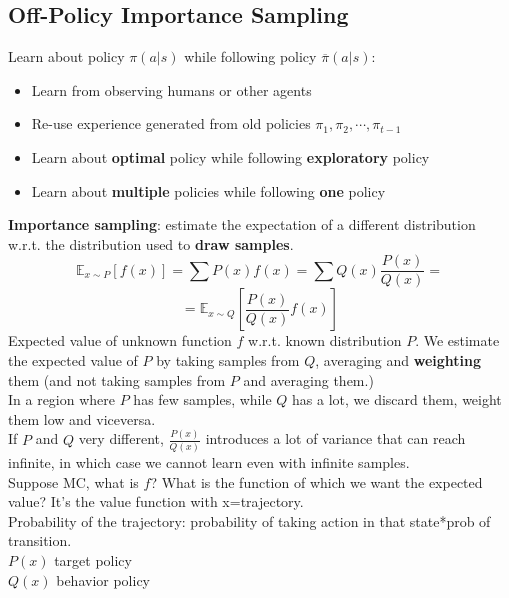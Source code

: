 \subsection{Off-Policy Importance Sampling}
    Learn about policy $\pi(a|s)$ while following policy $\overline{\pi}(a|s)$:
    \begin{itemize}
        \item Learn from observing humans or other agents
        \item Re-use experience generated from old policies $\pi_1,\pi_2,\cdots,\pi_{t-1}$
        \item Learn about \textbf{optimal} policy while following \textbf{exploratory} policy
        \item Learn about \textbf{multiple} policies while following \textbf{one} policy
    \end{itemize}
    \textbf{Importance sampling}: estimate the expectation of a different distribution w.r.t. the distribution used to \textbf{draw samples}.
    $$\mathbb{E}_{x\sim P}[f(x)]=\sum P(x)f(x) = \sum Q(x)\frac{P(x)}{Q(x)}=$$
    $$=\mathbb{E}_{x\sim Q}\left[\frac{P(x)}{Q(x)}f(x)\right]$$
    Expected value of unknown function $f$ w.r.t. known distribution $P$. We estimate the expected value of $P$ by taking samples from $Q$, averaging and \textbf{weighting} them (and not taking samples from $P$ and averaging them.)\\
    In a region where $P$ has few samples, while $Q$ has a lot, we discard them, weight them low and viceversa.\\
    If $P$ and $Q$ very different, $\frac{P(x)}{Q(x)}$ introduces a lot of variance that can reach infinite, in which case we cannot learn even with infinite samples.\\
    Suppose MC, what is $f$? What is the function of which we want the expected value? It's the value function with x=trajectory.\\
    Probability of the trajectory: probability of taking action in that state*prob of transition.\\
    $P(x)$ target policy\\
    $Q(x)$ behavior policy
